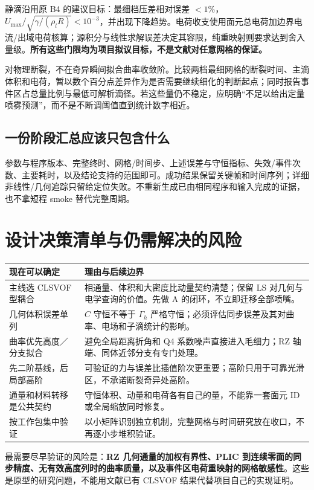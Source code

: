 \documentclass[11pt,a4paper]{article}
\begin{document}
静滴沿用原 B4 的建议目标：最细档压差相对误差 $<1\%$，$U_{\max}/\sqrt{\gamma/(\rho_lR)}<10^{-3}$，并出现下降趋势。电荷收支使用面元总电荷加边界电流/出域电荷核算；源积分与线性求解误差决定其容限，纯重映射则要求达到舍入量级。\textbf{所有这些门限均为项目拟议目标，不是文献对任意网格的保证。}

对物理断裂，不在奇异瞬间拟合曲率收敛阶。比较两档最细网格的断裂时间、主滴体积和电荷，暂以数个百分点差异作为是否需要继续细化的判断起点；同时报告事件区占总量比例与最低可解析滴径。若这些量仍不稳定，应明确“不足以给出定量喷雾预测”，而不是不断调阈值直到统计数字相近。

\subsection{一份阶段汇总应该只包含什么}
参数与程序版本、完整终时、网格/时间步、上述误差与守恒指标、失效/事件次数、主要耗时，以及结论支持的范围即可。成功结果保留关键帧和时间序列；详细非线性/几何追踪只留给定位失败。不重新生成已由相同程序和输入完成的证据，也不拿短程 smoke 替代完整周期。

\section{设计决策清单与仍需解决的风险}
\begin{longtable}{L{36mm}L{113mm}}
\toprule 现在可以确定 & 理由与后续边界\\\midrule\endhead
主线选 CLSVOF 型耦合 & 相通量、体积和大密度比动量契约清楚；保留 LS 对几何与电学查询的价值。先做 A 的闭环，不立即迁移全部喷嘴。\\
几何体积误差单列 & $C$ 守恒不等于 $\Gamma_h$ 严格守恒；必须评估同步误差及其对曲率、电场和子滴统计的影响。\\
曲率优先高度／分支拟合 & 避免全局距离折角和 Q4 系数噪声直接进入毛细力；RZ 轴端、同体近邻分支有专门处理。\\
先二阶基线，后局部高阶 & 可验证的力与误差比插值阶次更重要；高阶只用于可靠光滑区，不承诺断裂奇异处高阶。\\
通量和材料转移是公共契约 & 守恒体积、动量和电荷各有自己的量，不能靠一套面元 ID 或全局缩放同时修复。\\
按工作包集中验证 & 以小矩阵识别独立机制，完整网格与时间研究放在收口，不再逐小步堆积验证。\\\bottomrule
\end{longtable}
最需要尽早验证的风险是：\textbf{RZ 几何通量的加权有界性、PLIC 到连续零面的同步精度、无有效高度列时的曲率质量，以及事件区电荷重映射的网格敏感性}。这些是原型的研究问题，不能用文献已有 CLSVOF 结果代替项目自己的实现证明。
\end{document}
